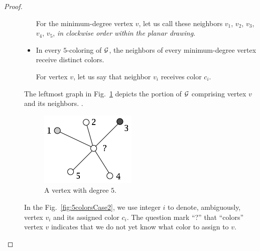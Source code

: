 \begin{proof}
\begin{description}
\begin{itemize}
\smallskip

For the minimum-degree vertex $v$, let us call these neighbors $v_1$, $v_2$, $v_3$, $v_4$, $v_5$, {\em in clockwise order within the planar drawing}.
\item
In every $5$-coloring of $\mbox{$\cal G$}$, the neighbors of every minimum-degree vertex receive distinct colors.

\smallskip

For vertex $v$, let us say that neighbor $v_i$ receives color $c_i$.
\end{itemize}
The leftmost graph in Fig.~\ref{fig:5colorsInit} depicts the portion of $\mbox{$\cal G$}$ comprising vertex $v$ and its neighbors.  .
\begin{figure}[hbt]
\begin{center}
   \includegraphics[scale=0.45]{FiguresGraph/5colorsInit}
\caption{A vertex with degree $5$.}
  \label{fig:5colorsInit}
\end{center}
\end{figure}
In the Fig.~\ref{fig:5colorsCase2}, we use integer $i$ to denote, ambiguously, vertex $v_i$ and its assigned color $c_i$.  
The question mark ``?'' that ``colors'' vertex $v$ indicates that we do not yet know what color to assign to $v$.  


\end{description}
\end{proof}
